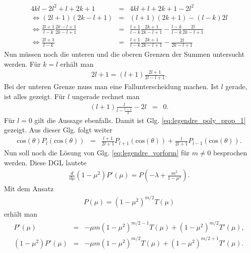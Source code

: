 \documentclass{book}
\renewcommand{\cos}{\text{cos}}
\begin{document}
%
\begin{eqnarray}
4kl - 2l^2 + l + 2k + 1 & = & 4kl + l + 2k + 1 - 2l^2\nonumber\\
\Leftrightarrow\left(2l + 1\right)\left(2k - l + 1\right) & = & \left(l + 1\right)\left(2k + 1\right) - \left(l - k\right)2l\\
\Leftrightarrow\frac{2l + 1}{l - k}\frac{2k - l + 1}{2k - l + 1} & = & \frac{l + 1}{l - k}\frac{2k + 1}{2k - l + 1} - \frac{l - k}{l - k}\frac{2l}{2k - l + 1}\nonumber\\
\Leftrightarrow\frac{2l + 1}{l - k} & = & \frac{l + 1}{l - k}\frac{2k + 1}{2k - l + 1} - \frac{2l}{2k - l + 1}
\end{eqnarray}
%
Nun müssen noch die unteren und die oberen Grenzen der Summen untersucht werden. Für $k = l$ erhält man
%
\begin{eqnarray}
2l + 1 = \left(l + 1\right)\frac{2l + 1}{2l - l + 1}.
\end{eqnarray}
%
Bei der unteren Grenze muss man eine Fallunterscheidung machen. Ist $l$ gerade, ist alles gezeigt. Für $l$ ungerade rechnet man
%
\begin{eqnarray}
\left(l + 1\right)\frac{l}{l - \frac{l - 1}{2}} - 2l & = & 0.
\end{eqnarray}
%
Für $l = 0$ gilt die Aussage ebenfalls. Damit ist Glg. \eqref{eq:legendre_poly_prop_1} gezeigt. Aus dieser Glg. folgt weiter
%
\begin{eqnarray}
\cos\left(\theta\right)P_l\left(\cos\left(\theta\right)\right) & = & \frac{l + 1}{2l + 1}P_{l + 1}\left(\cos\left(\theta\right)\right) + \frac{l}{2l + 1}P_{l - 1}\left(\cos\left(\theta\right)\right).\label{eq:legendre_poly_prop_2}
\end{eqnarray}
%
Nun soll noch die Lösung von Glg. \eqref{eq:legendre_vorform} für $m\not = 0$ besprochen werden. Diese DGL lautete
%
\begin{eqnarray}
\frac{d}{d\mu}\left(1 - \mu^2\right)P'\left(\mu\right) = P\left(-\lambda + \frac{m^2}{1 - \mu^2}\right).\label{eq:legendre_vorform_2}
\end{eqnarray}
%
Mit dem Ansatz
%
\begin{eqnarray}
P\left(\mu\right) = \left(1 - \mu^2\right)^{m/2}T\left(\mu\right)\label{eq:ansatz_legendre_2}
\end{eqnarray}
%
erhält man
%
\begin{eqnarray}
P'\left(\mu\right) & = & -\mu m\left(1 - \mu^2\right)^{m/2 - 1}T\left(\mu\right) + \left(1 - \mu^2\right)^{m/2}T'\left(\mu\right),\\
\left(1 - \mu^2\right)P'\left(\mu\right) & = & -\mu m\left(1 - \mu^2\right)^{m/2}T\left(\mu\right) + \left(1 - \mu^2\right)^{m/2 + 1}T'\left(\mu\right).
\end{eqnarray}
\end{document}
